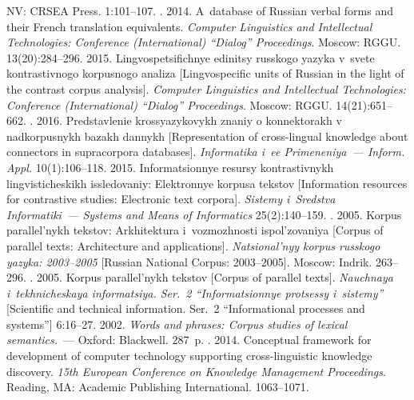\begin{multicols}{2}
{{\begin{thebibliography}{99}
NV: CRSEA 
Press. 1:101--107.
. 2014. A~database of Russian verbal forms and their 
French translation equivalents. \textit{Computer Linguistics and 
Intellectual Technologies: Conference (International) ``Dialog'' Proceedings}. Moscow: RGGU. 
13(20):284--296.
 2015. Lingvospetsifichnye edi\-ni\-tsy russkogo yazyka v~svete 
kontrastivnogo korpusnogo analiza
[Lingvospecific units of Russian in the light of the contrast corpus analysis].
\textit{Computer Linguistics and 
Intellectual Technologies: Conference (International) ``Dialog'' Proceedings}. 
Moscow: RGGU. 
14(21):651--662.
. 2016. 
Predstavlenie krossyazykovykh znaniy o konnektorakh v nadkorpusnykh bazakh dannykh 
[Representation of cross-lingual knowledge about connectors in supracorpora databases]. 
\textit{Informatika i~ee Primeneniya~--- Inform. Appl.} 10(1):106--118.
 2015. Informatsionnye resursy kontrastivnykh lingvisticheskikh 
issledovaniy: Elektronnye korpusa tekstov [Information resources for contrastive studies: 
Electronic text corpora]. \textit{Sistemy i~Sredstva Informatiki~--- Systems and Means of 
Informatics} 25(2):140--159.
. 2005. Korpus parallel'nykh 
tekstov: Arkhitektura i~voz\-mozh\-no\-sti ispol'zovaniya [Corpus of parallel texts: Architecture and 
applications]. \textit{Natsional'nyy korpus russkogo yazyka: 2003--2005} [Russian National 
Corpus: 2003--2005]. Moscow: Indrik. 263--296.
. 2005. Korpus parallel'nykh 
tekstov [Corpus of parallel texts]. \textit{Nauchnaya i~tekhnicheskaya informatsiya. Ser.~2 
``Informatsionnye protsessy i~sistemy''} [Scientific and technical information. Ser.~2 
``Informational processes and systems''] 6:16--27.
 2002. \textit{Words and phrases: Corpus studies of lexical semantics.}~--- 
Oxford: Blackwell. 287~p.
. 2014. 
Conceptual framework for development of computer technology supporting cross-linguistic 
knowledge discovery. \textit{15th European Conference on Knowledge Management 
Proceedings}. Reading, MA: Academic Publishing International. 1063--1071.

\end{thebibliography}}}
\end{multicols}
